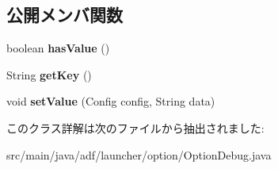 \subsection*{公開メンバ関数}
\begin{DoxyCompactItemize}
\item 
\hypertarget{classadf_1_1launcher_1_1option_1_1OptionDebug_a50e3dfa02807810da389fcf1180813c3}{}\label{classadf_1_1launcher_1_1option_1_1OptionDebug_a50e3dfa02807810da389fcf1180813c3} 
boolean {\bfseries has\+Value} ()
\item 
\hypertarget{classadf_1_1launcher_1_1option_1_1OptionDebug_a4554331694ccee9672befc791354ee62}{}\label{classadf_1_1launcher_1_1option_1_1OptionDebug_a4554331694ccee9672befc791354ee62} 
String {\bfseries get\+Key} ()
\item 
\hypertarget{classadf_1_1launcher_1_1option_1_1OptionDebug_ad4993fa279ccdba290b8f75ec16429ca}{}\label{classadf_1_1launcher_1_1option_1_1OptionDebug_ad4993fa279ccdba290b8f75ec16429ca} 
void {\bfseries set\+Value} (Config config, String data)
\end{DoxyCompactItemize}


このクラス詳解は次のファイルから抽出されました\+:\begin{DoxyCompactItemize}
\item 
src/main/java/adf/launcher/option/Option\+Debug.\+java\end{DoxyCompactItemize}
